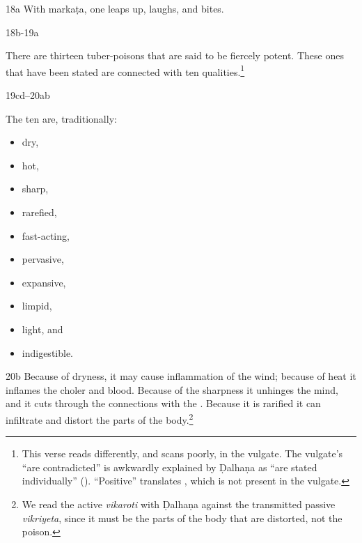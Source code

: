 \begin{translation}
    \item[ 18a]
    With
    \gls{markaṭa}, one leaps up, laughs, and 
    bites.
    
    
    \item[ 18b-19a]
      
    There are thirteen tuber-poisons that are said to be fiercely
potent.  These ones that have been stated are connected with ten
 qualities.\footnote{This verse reads
    differently, and scans poorly, in the vulgate. The vulgate's
     “are contradicted” is awkwardly explained by
    Ḍalhaṇa as “are stated individually” (). “Positive” 
    translates , which is not present in the vulgate.}
    
    \item[19cd--20ab]
    
    The ten are, traditionally:
    \begin{itemize}
        \item   dry, %
        \item hot, 
        \item sharp, 
        \item rarefied, %
        \item     fast-acting, 
        \item pervasive, %
        \item expansive, %
        \item limpid, %
        \item     light, and 
        \item indigestible.    
    \end{itemize}
    \item[ 20b]
    Because of dryness, it may cause inflammation of the wind; because of heat
    it inflames the choler and blood. 
    Because of the sharpness it unhinges the
    mind, and it cuts through the connections with the .  Because it is rarified it can infiltrate and distort
    the parts of the body.\footnote{We read the active \emph{vikaroti} with 
    Ḍalhaṇa against the 
    transmitted passive \emph{vikriyeta}, since it must be the parts of the body 
    that are distorted, not the poison.}    
    


\end{translation}
